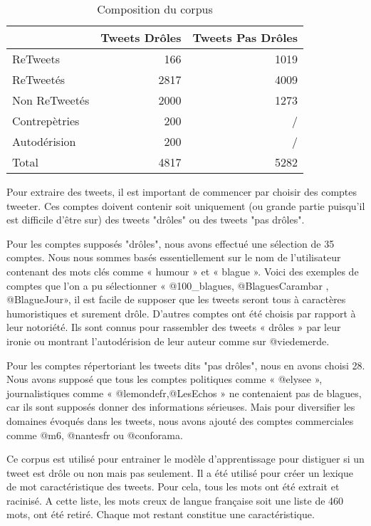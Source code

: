 \documentclass[10pt,a4paper,twoside]{article}
\begin{document}
\begin{table}[!h]
\centering
	\begin{tabular}{lrr}
	\toprule
	& Tweets Drôles & Tweets Pas Drôles \\
	\midrule
	 ReTweets & 166 & 1019 \\
	
	 ReTweetés & 2817 & 4009 \\
	
	Non ReTweetés & 2000 & 1273 \\
	
	Contrepètries & 200 & / \\
	Autodérision & 200 & / \\
	 \midrule
	Total & 4817 & 5282 \\
	\bottomrule
	\end{tabular}
\caption{Composition du corpus}
\end{table}


Pour extraire des tweets, il est important de commencer par choisir des comptes tweeter. Ces comptes doivent contenir soit uniquement (ou grande partie puisqu'il est difficile d'être sur) des tweets "drôles" ou des tweets "pas drôles".

Pour les comptes supposés "drôles", nous avons effectué une sélection de 35 comptes. Nous nous sommes basés essentiellement sur le nom de l'utilisateur contenant des mots clés comme « humour » et « blague ». Voici des exemples de comptes que l'on a pu sélectionner « @100\_blagues, @BlaguesCarambar , @BlagueJour», il est facile de supposer que les tweets seront tous à caractères humoristiques et surement drôle. D'autres comptes ont été choisis par rapport à leur notoriété. Ils sont connus pour rassembler des tweets « drôles » par leur ironie ou montrant l'autodérision de leur auteur comme sur @viedemerde.

Pour les comptes répertoriant les tweets dits "pas drôles", nous en avons choisi 28. Nous avons supposé que tous les comptes politiques comme « @elysee », journalistiques comme « @lemondefr,@LesEchos » ne contenaient pas de blagues, car ils sont supposés donner des informations sérieuses. Mais pour diversifier les domaines évoqués dans les tweets, nous avons ajouté des comptes commerciales comme @m6, @nantesfr ou @conforama.

Ce corpus est utilisé pour entrainer le modèle d'apprentissage pour distiguer si un tweet est drôle ou non mais pas seulement. Il a été utilisé pour créer un lexique de mot caractéristique des tweets. Pour cela, tous les mots ont été extrait et racinisé. A cette liste, les mots creux de langue française soit une liste de 460 mots, ont été retiré. Chaque mot restant constitue une caractéristique.
\end{document}
